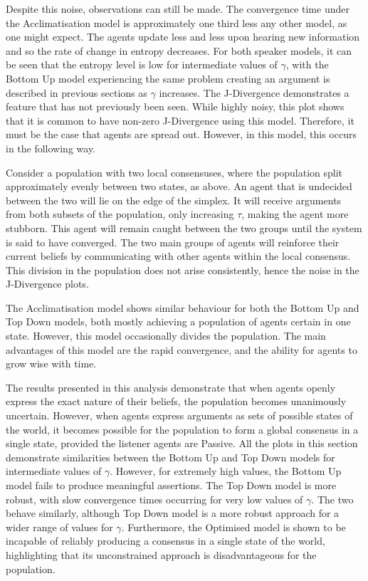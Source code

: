 Despite this noise, observations can still be made. The convergence time under the Acclimatisation model is approximately one third less any other model, as one might expect. The agents update less and less upon hearing new information and so the rate of change in entropy decreases. For both speaker models, it can be seen that the entropy level is low for intermediate values of $\gamma$, with the Bottom Up model experiencing the same problem creating an argument is described in previous sections as $\gamma$ increases. The J-Divergence demonstrates a feature that has not previously been seen. While highly noisy, this plot shows that it is common to have non-zero J-Divergence using this model. Therefore, it must be the case that agents are spread out. However, in this model, this occurs in the following way. 

Consider a population with two local consensuses, where the population split approximately evenly between two states, as above. An agent that is undecided between the two will lie on the edge of the simplex. It will receive arguments from both subsets of the population, only increasing $\tau$, making the agent more stubborn. This agent will remain caught between the two groups until the system is said to have converged. The two main groups of agents will reinforce their current beliefs by communicating with other agents within the local consensus. This division in the population does not arise consistently, hence the noise in the J-Divergence plots. 


The Acclimatisation model shows similar behaviour for both the Bottom Up and Top Down models, both mostly achieving a population of agents certain in one state. However, this model occasionally divides the population. The main advantages of this model are the rapid convergence, and the ability for agents to grow wise with time. 





The results presented in this analysis demonstrate that when agents openly express the exact nature of their beliefs, the population becomes unanimously uncertain. However, when agents express arguments as sets of possible states of the world, it becomes possible for the population to form a global consensus in a single state, provided the listener agents are Passive. All the plots in this section demonstrate similarities between the Bottom Up and Top Down models for intermediate values of $\gamma$. However, for extremely high values, the Bottom Up model fails to produce meaningful assertions. The Top Down model is more robust, with slow convergence times occurring for very low values of $\gamma$. The two behave similarly, although Top Down model is a more robust approach for a wider range of values for $\gamma$. Furthermore, the Optimised model is shown to be incapable of reliably producing a consensus in a single state of the world, highlighting that its unconstrained approach is disadvantageous for the population. 

